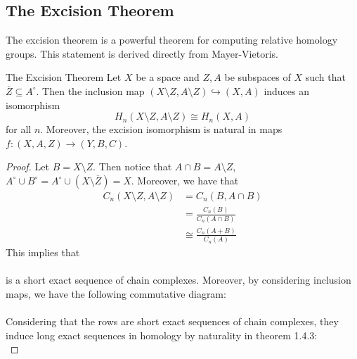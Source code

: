 \documentclass[a4paper]{article}
\begin{document}
\subsection{The Excision Theorem}
The excision theorem is a powerful theorem for computing relative homology groups. This statement is derived directly from Mayer-Vietoris. 

\begin{thm}{The Excision Theorem}{} Let $X$ be a space and $Z,A$ be subspaces of $X$ such that $\overline{Z}\subseteq A^\circ$. Then the inclusion map $(X\setminus Z,A\setminus Z)\hookrightarrow (X,A)$ induces an isomorphism $$H_n(X\setminus Z,A\setminus Z)\cong H_n(X,A)$$ for all $n$. Moreover, the excision isomorphism is natural in maps $f:(X,A,Z)\to(Y,B,C)$. 
\begin{proof}
Let $B=X\setminus Z$. Then notice that $A\cap B=A\setminus Z$, $A^\circ\cup B^\circ=A^\circ\cup(X\setminus\overline{Z})=X$. Moreover, we have that 
\begin{align*}
C_n(X\setminus Z,A\setminus Z)&=C_n(B,A\cap B)\\
&=\frac{C_n(B)}{C_n(A\cap B)}\tag{By definition}\\
&\cong\frac{C_n(A+B)}{C_n(A)}\tag{Second Isomorphism Theorem}
\end{align*}
This implies that \\
\\
is a short exact sequence of chain complexes. Moreover, by considering inclusion maps, we have the following commutative diagram: \\
\\
Considering that the rows are short exact sequences of chain complexes, they induce long exact sequences in homology by naturality in theorem 1.4.3: \\
\end{proof}
\end{thm}
\end{document}
